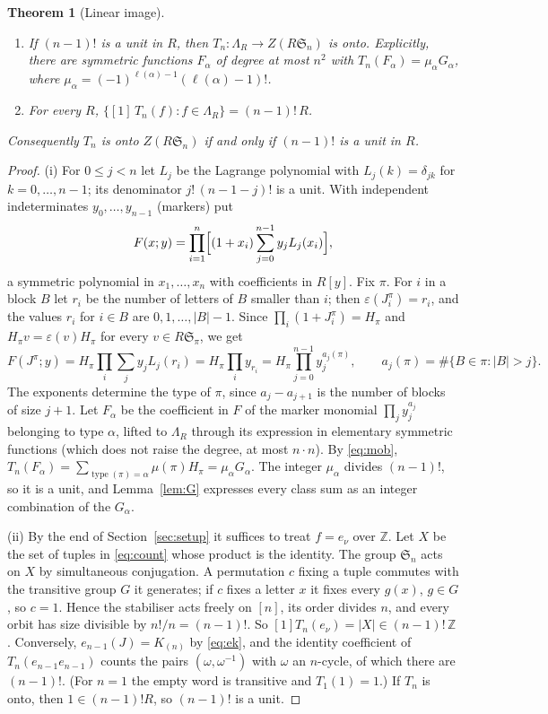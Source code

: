 \documentclass[11pt,a4paper]{article}
\newtheorem{theorem}{Theorem}[section]
\theoremstyle{definition}
\newcommand{\Sn}{\mathfrak S}
\newcommand{\Z}{\mathbb Z}
\DeclareMathOperator{\type}{type}
\begin{document}
\begin{theorem}[Linear image]\label{th:centre}
\begin{enumerate}[label=(\roman*)]
\item If $(n-1)!$ is a unit in $R$, then $T_n:\Lambda_R\to Z(R\Sn_n)$ is onto. Explicitly, there are symmetric functions $F_\alpha$ of degree at most $n^2$ with $T_n(F_\alpha)=\mu_\alpha G_\alpha$, where $\mu_\alpha=(-1)^{\ell(\alpha)-1}(\ell(\alpha)-1)!$.
\item For every $R$, $\{[1]\,T_n(f): f\in\Lambda_R\}=(n-1)!\,R$.
\end{enumerate}
Consequently $T_n$ is onto $Z(R\Sn_n)$ if and only if $(n-1)!$ is a unit in $R$.
\end{theorem}
\begin{proof}
(i) For $0\le j<n$ let $L_j$ be the Lagrange polynomial with $L_j(k)=\delta_{jk}$ for $k=0,\ldots,n-1$; its denominator $j!\,(n-1-j)!$ is a unit. With independent indeterminates $y_0,\ldots,y_{n-1}$ (markers) put
\[
 F(x;y)=\prod_{i=1}^n\Bigl[(1+x_i)\sum_{j=0}^{n-1}y_jL_j(x_i)\Bigr],
\]
a symmetric polynomial in $x_1,\ldots,x_n$ with coefficients in $R[y]$. Fix $\pi$. For $i$ in a block $B$ let $r_i$ be the number of letters of $B$ smaller than $i$; then $\varepsilon(J^\pi_i)=r_i$, and the values $r_i$ for $i\in B$ are $0,1,\ldots,|B|-1$. Since $\prod_i(1+J^\pi_i)=H_\pi$ and $H_\pi v=\varepsilon(v)H_\pi$ for every $v\in R\Sn_\pi$, we get
\[
 F(J^\pi;y)=H_\pi\prod_i\sum_jy_jL_j(r_i)=H_\pi\prod_iy_{r_i}=H_\pi\prod_{j=0}^{n-1}y_j^{a_j(\pi)},\qquad a_j(\pi)=\#\{B\in\pi:|B|>j\}.
\]
The exponents determine the type of $\pi$, since $a_j-a_{j+1}$ is the number of blocks of size $j+1$. Let $F_\alpha$ be the coefficient in $F$ of the marker monomial $\prod_jy_j^{a_j}$ belonging to type $\alpha$, lifted to $\Lambda_R$ through its expression in elementary symmetric functions (which does not raise the degree, at most $n\cdot n$). By \eqref{eq:mob}, $T_n(F_\alpha)=\sum_{\type(\pi)=\alpha}\mu(\pi)H_\pi=\mu_\alpha G_\alpha$. The integer $\mu_\alpha$ divides $(n-1)!$, so it is a unit, and Lemma~\ref{lem:G} expresses every class sum as an integer combination of the $G_\alpha$.

(ii) By the end of Section~\ref{sec:setup} it suffices to treat $f=e_\nu$ over $\Z$. Let $X$ be the set of tuples in \eqref{eq:count} whose product is the identity. The group $\Sn_n$ acts on $X$ by simultaneous conjugation. A permutation $c$ fixing a tuple commutes with the transitive group $G$ it generates; if $c$ fixes a letter $x$ it fixes every $g(x)$, $g\in G$, so $c=1$. Hence the stabiliser acts freely on $[n]$, its order divides $n$, and every orbit has size divisible by $n!/n=(n-1)!$. So $[1]T_n(e_\nu)=|X|\in(n-1)!\,\Z$. Conversely, $e_{n-1}(J)=K_{(n)}$ by \eqref{eq:ek}, and the identity coefficient of $T_n(e_{n-1}e_{n-1})$ counts the pairs $(\omega,\omega^{-1})$ with $\omega$ an $n$-cycle, of which there are $(n-1)!$. (For $n=1$ the empty word is transitive and $T_1(1)=1$.) If $T_n$ is onto, then $1\in(n-1)!R$, so $(n-1)!$ is a unit.
\end{proof}
\end{document}

